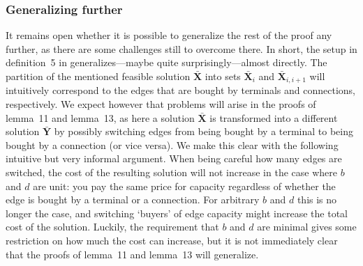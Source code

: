 \subsubsection{Generalizing further}
It remains open whether it is possible to generalize the rest of the proof any further, as there are some challenges still to overcome there.
In short, the setup in definition~5 in \cite{bosman2017exploring} generalizes---maybe quite surprisingly---almost directly.
The partition of the mentioned feasible solution $\bar{\boldsymbol X}$ into sets $\bar{\boldsymbol X}_i$ and $\bar{\boldsymbol X}_{i,i+1}$ will intuitively correspond to the edges that are bought by terminals and connections, respectively.
We expect however that problems will arise in the proofs of lemma~11 and lemma~13, as here a solution $\bar{\boldsymbol X}$ is transformed into a different solution $\bar{\boldsymbol Y}$ by possibly switching edges from being bought by a terminal to being bought by a connection (or vice versa).
We make this clear with the following intuitive but very informal argument.
When being careful how many edges are switched, the cost of the resulting solution will not increase in the case where $b$ and $d$ are unit: you pay the same price for capacity regardless of whether the edge is bought by a terminal or a connection.
For arbitrary $b$ and $d$ this is no longer the case, and switching `buyers' of edge capacity might increase the total cost of the solution.
Luckily, the requirement that $b$ and $d$ are minimal gives some restriction on how much the cost can increase, but it is not immediately clear that the proofs of lemma~11 and lemma~13 will generalize.

